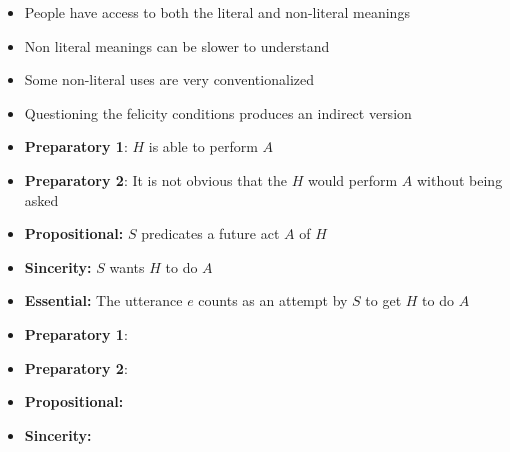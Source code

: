 \documentclass[headrule,footrule]{foils}
\begin{document}
\begin{exe}
  \ex
  \begin{xlist}
    \ex {}
    \ex {}
  \end{xlist}
  \ex 
  \begin{xlist}
    \ex {}
    \ex {}
  \end{xlist}
  \ex
  \begin{xlist}
    \ex {}
    \ex {}
  \end{xlist}
\end{exe}
\begin{itemize}
\item People have access to both the literal and non-literal meanings
\item Non literal meanings can be slower to understand
\item Some non-literal uses are very conventionalized 
  \\  \into {}
\item Questioning the felicity conditions produces an indirect version
\end{itemize}


\begin{small}
  \begin{itemize}
\item \textbf{Preparatory 1}: $H$ is able to perform  $A$
\item \textbf{Preparatory 2}: It is not obvious that the $H$ would perform $A$  without being asked
\item \textbf{Propositional:} $S$ predicates a future act $A$ of $H$
\item \textbf{Sincerity:}  $S$ wants $H$ to do $A$ 
\item \textbf{Essential:} The utterance $e$ counts as an attempt by $S$ to get $H$ to do $A$
\end{itemize}
\end{small}
  \begin{itemize}
\item \textbf{Preparatory 1}: 
\item \textbf{Preparatory 2}: 
\item \textbf{Propositional:} 
\item \textbf{Sincerity:}  
\end{itemize}
\end{document}
